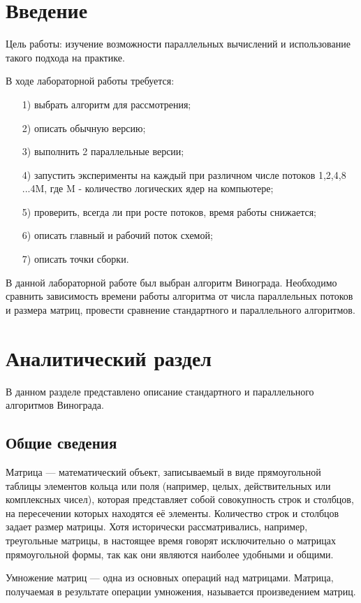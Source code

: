 \documentclass[14pt, a4paper]{extarticle}
\begin{document}
\section*{Введение}
Цель работы: изучение возможности параллельных вычислений и использование такого подхода на практике.\par
В ходе лабораторной работы требуется:
\begin{enumerate}
	\item[1)] выбрать алгоритм для рассмотрения;
	\item[2)] описать обычную версию;
	\item[3)] выполнить 2 параллельные версии;
	\item[4)] запустить эксперименты на каждый при различном числе потоков 1,2,4,8 ...4M, где M - количество логических ядер на компьютере;
	\item[5)] проверить, всегда ли при росте потоков, время работы снижается;
	\item[6)] описать главный и рабочий поток схемой;
	\item[7)] описать точки сборки.
\end{enumerate}
В данной лабораторной работе был выбран алгоритм Винограда. Необходимо сравнить зависимость времени работы алгоритма от числа параллельных потоков и размера матриц, провести сравнение стандартного и параллельного алгоритмов.

\clearpage
\section{Аналитический раздел}
В данном разделе представлено описание стандартного и параллельного алгоритмов Винограда.
\subsection{Общие сведения}
Матрица — математический объект, записываемый в виде прямоугольной таблицы элементов кольца или поля (например, целых, действительных или комплексных чисел), которая представляет собой совокупность строк и столбцов, на пересечении которых находятся её элементы. Количество строк и столбцов задает размер матрицы. Хотя исторически рассматривались, например, треугольные матрицы, в настоящее время говорят исключительно о матрицах прямоугольной формы, так как они являются наиболее удобными и общими. \par
Умножение матриц — одна из основных операций над матрицами. Матрица, получаемая в результате операции умножения, называется произведением матриц.
\end{document}
